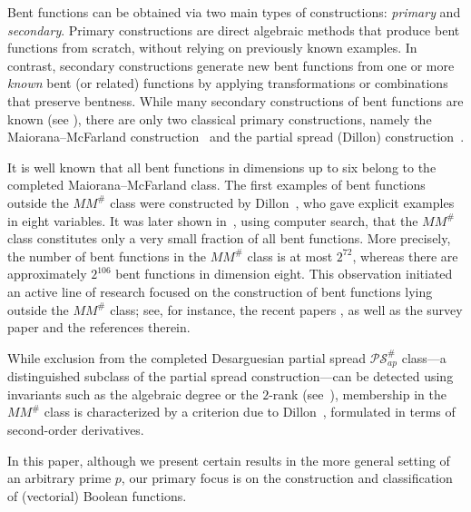 \documentclass[12pt]{article}
\theoremstyle{plain}
\theoremstyle{definition}
\begin{document}
	\smallskip
	
	Bent functions can be obtained via two main types of constructions:
	\emph{primary} and \emph{secondary}.
	Primary constructions are direct algebraic methods that produce bent functions
	from scratch, without relying on previously known examples.
	In contrast, secondary constructions generate new bent functions from one or
	more \emph{known} bent (or related) functions by applying transformations or
	combinations that preserve bentness. While many secondary constructions of bent functions are known (see
	\cite[Section~6.1.16]{Carlet2021}), there are only two classical primary
	constructions, namely the Maiorana--McFarland construction~\cite{mm} and the
	partial spread (Dillon) construction~\cite{dillon}.
	
	It is well known that all bent functions in dimensions up to six belong to the
	completed Maiorana--McFarland class. The first examples of bent
	functions outside the \(MM^{\#}\) class were constructed by Dillon~\cite{dillon},
	who gave explicit examples in eight variables. It was later shown in~\cite{ll},
	using computer search, that the \(MM^{\#}\) class constitutes only a very small
	fraction of all bent functions. More precisely, the number of bent functions in
	the \(MM^{\#}\) class is at most \(2^{72}\), whereas there are approximately
	\(2^{106}\) bent functions in dimension eight. 
	This observation initiated an active line of research focused on the
	construction of bent functions lying outside the \(MM^{\#}\) class; see, for instance, the recent papers
	\cite{Letal2025,PasalicEtAl2024,PasalicEtAl2023,pp}, as well as the survey paper
	\cite{Pasalic26} and the references therein.
	
	While exclusion from the completed Desarguesian partial spread
	\(\mathcal{PS}_{ap}^{\#}\) class—a distinguished subclass of the partial spread
	construction—can be detected using invariants such as the algebraic degree or
	the \(2\)-rank (see~\cite{akm23,wfq}), membership in the \(MM^{\#}\) class is
	characterized by a criterion due to Dillon~\cite{dillon}, formulated in terms
	of second-order derivatives.
	
	In this paper, although we present certain results in the more general setting
	of an arbitrary prime \(p\), our primary focus is on the construction and
	classification of (vectorial) Boolean functions.
	
\end{document}
